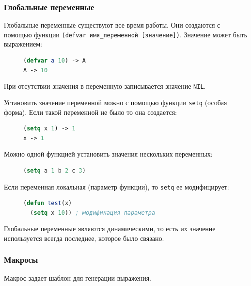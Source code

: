 \subsubsection{Глобальные переменные}

Глобальные переменные существуют все время работы. Они создаются с помощью функции \texttt{(defvar имя\_переменной [значение])}. Значение может быть выражением:

\begin{figure}[H]
\begin{lstlisting}[language=Lisp]
(defvar a 10) -> A
A -> 10
\end{lstlisting}
\end{figure}

При отсутствии значения в переменную записывается значение \texttt{NIL}.

Установить значение переменной можно с помощью функции \texttt{setq} (особая форма). Если такой переменной не было то она создается:

\begin{figure}[H]
\begin{lstlisting}[language=Lisp]
(setq x 1) -> 1
x -> 1
\end{lstlisting}
\end{figure}

Можно одной функцией установить значения нескольких переменных:

\begin{figure}[H]
\begin{lstlisting}[language=Lisp]
  (setq a 1 b 2 c 3)
\end{lstlisting}
\end{figure}

Если переменная локальная (параметр функции), то \texttt{setq} ее модифицирует:

\begin{figure}[H]
\begin{lstlisting}[language=Lisp]
(defun test(x)
  (setq x 10)) ; модификация параметра
\end{lstlisting}
\end{figure}

Глобальные переменные являются динамическими, то есть их значение используется всегда последнее, которое было связано.

\subsubsection{Макросы}

Макрос задает шаблон для генерации выражения.

